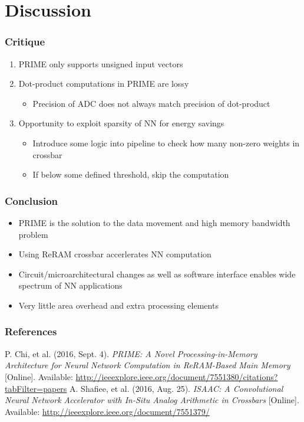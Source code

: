 \documentclass[hyperref={colorlinks}]{beamer}
\begin{document}
\section{Discussion}
\begin{frame}
	\frametitle{Critique}
	\begin{enumerate}
		\item PRIME only supports unsigned input vectors
		\item Dot-product computations in PRIME are lossy
		\begin{itemize}
			\item Precision of ADC does not always match precision of dot-product
		\end{itemize}
		\item Opportunity to exploit sparsity of NN for energy savings
		\begin{itemize}
			\item Introduce some logic into pipeline to check how many non-zero weights in crossbar
			\item If below some defined threshold, skip the computation
		\end{itemize}
	\end{enumerate}
\end{frame}
\begin{frame}
	\frametitle{Conclusion}
	\begin{itemize}
		\item PRIME is the solution to the data movement and high memory bandwidth problem
		\item Using ReRAM crossbar accerlerates NN computation
		\item Circuit/microarchitectural changes as well as software interface enables wide spectrum of NN applications
		\item Very little area overhead and extra processing elements
	\end{itemize}
\end{frame}

\begin{frame}
	\frametitle{References}
	\footnotesize{
		\begin{thebibliography}{9} %
			P. Chi, et al. (2016, Sept. 4).
			\emph{PRIME: A Novel Processing-in-Memory Architecture for Neural Network Computation in ReRAM-Based Main Memory} [Online].
			Available: \url{http://ieeexplore.ieee.org/document/7551380/citations?tabFilter=papers}
			A. Shafiee, et al. (2016, Aug. 25).
			\emph{ISAAC: A Convolutional Neural Network Accelerator with In-Situ Analog Arithmetic in Crossbars} [Online].
			Available: \url{http://ieeexplore.ieee.org/document/7551379/}
		\end{thebibliography}
	}
\end{frame}
\end{document}
